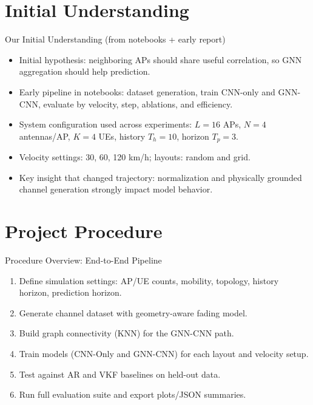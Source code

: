 \documentclass{beamer}
\begin{document}
\section{Initial Understanding}

\begin{frame}{Our Initial Understanding (from notebooks + early report)}
    \footnotesize
    \begin{itemize}
        \item Initial hypothesis: neighboring APs should share useful correlation, so GNN aggregation should help prediction.
        \item Early pipeline in notebooks: dataset generation, train CNN-only and GNN-CNN, evaluate by velocity, step, ablations, and efficiency.
        \item System configuration used across experiments: $L=16$ APs, $N=4$ antennas/AP, $K=4$ UEs, history $T_h=10$, horizon $T_p=3$.
        \item Velocity settings: 30, 60, 120 km/h; layouts: random and grid.
        \item Key insight that changed trajectory: normalization and physically grounded channel generation strongly impact model behavior.
    \end{itemize}
\end{frame}

\section[Procedure]{Project Procedure}

\begin{frame}{Procedure Overview: End-to-End Pipeline}
    \small
    \begin{enumerate}
        \item Define simulation settings: AP/UE counts, mobility, topology, history horizon, prediction horizon.
        \item Generate channel dataset with geometry-aware fading model.
        \item Build graph connectivity (KNN) for the GNN-CNN path.
        \item Train models (CNN-Only and GNN-CNN) for each layout and velocity setup.
        \item Test against AR and VKF baselines on held-out data.
        \item Run full evaluation suite and export plots/JSON summaries.
    \end{enumerate}
\end{frame}
\end{document}
